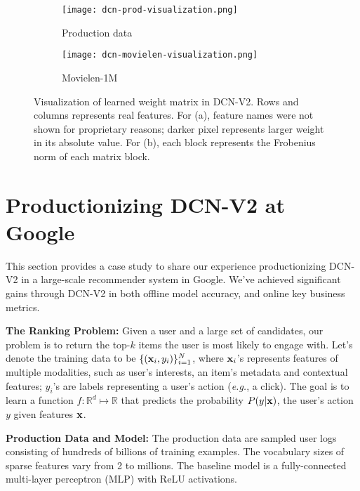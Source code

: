 \documentclass[sigconf]{acmart}
\newcommand{\vecx}{{\bf x}}
\begin{document}
\begin{figure}[htbp]
\centering
    \begin{subfigure}[b]{0.18\textwidth}  
    \texttt{[image: dcn-prod-visualization.png]}
    \caption{Production data}
    \end{subfigure}
    \hfill
    \begin{subfigure}[b]{0.22\textwidth}  
    \texttt{[image: dcn-movielen-visualization.png]}
    \caption{Movielen-1M}
    \end{subfigure}
    \caption{Visualization of learned weight matrix in {DCN-V2}. Rows and columns represents real features. For (a), feature names were not shown for proprietary reasons; darker pixel represents larger weight in its absolute value. For (b), each block represents the Frobenius norm of each matrix block.}
\label{fig:dcn-mat-visualization}
\end{figure}

\section{Productionizing {DCN-V2} at Google}
\label{sec:productionization}
This section provides a case study to share our experience productionizing {DCN-V2} in a large-scale recommender system in Google. We've achieved significant gains through {DCN-V2} in both offline model accuracy, and online key business metrics.

{\bf The Ranking Problem:}
Given a user and a large set of candidates, our problem is to return the top-$k$ items the user is most likely to engage with. Let's denote the training data to be $\{(\vecx_i, y_i)\}_{i=1}^N$, where $\vecx_i$'s represents features of multiple modalities, such as user's interests, an item's metadata and contextual features; $y_i$'s are labels representing a user's action (\emph{e.g.}, a click). The goal is to learn a function $f: \mathbb{R}^d \mapsto \mathbb{R}$ that predicts the probability $P(y | \vecx)$, the user's action $y$ given features $\vecx$.

{\bf Production Data and Model:}
The production data are sampled user logs consisting of hundreds of billions of training examples. The vocabulary sizes of sparse features vary from 2 to millions. The baseline model is a fully-connected multi-layer perceptron (MLP) with ReLU activations.
\end{document}

